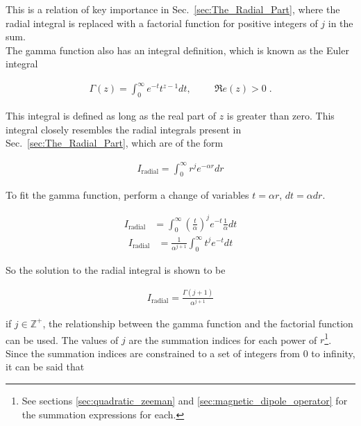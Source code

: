         \noindent This is a relation of key importance in Sec.~\ref{sec:The_Radial_Part}, where the radial integral is replaced with a factorial function for positive integers of $j$ in the sum.\\

        The gamma function also has an integral definition, which is known as the Euler integral

        \begin{align}
            \Gamma(z) = \int_0^\infty e^{-t} t^{z-1} dt, \hspace{1cm} \mathfrak{R}e(z) > 0\;.
        \end{align}

        \noindent This integral is defined as long as the real part of $z$ is greater than zero. This integral closely resembles the radial integrals present in Sec.~\ref{sec:The_Radial_Part}, which are of the form

        \begin{align}
            I_{\text{radial}} = \int_0^\infty r^j e^{-\alpha r} dr
        \end{align}

        \noindent To fit the gamma function, perform a change of variables $t = \alpha r$, $dt = \alpha dr$.

        \begin{align}
            I_{\text{radial}} &= \int_0^\infty \left( \frac{t}{\alpha} \right)^j e^{-t} \frac{1}{\alpha} dt
        \end{align}
        \begin{align}
            I_{\text{radial}} &= \frac{1}{\alpha^{j+1}}\int_0^\infty {t}^j e^{-t} dt
        \end{align}

        \noindent So the solution to the radial integral is shown to be 

        \begin{align}
            I_{\text{radial}} = \frac{\Gamma(j+1)}{\alpha^{j+1}}
        \end{align}

        \noindent if $j \in \mathbb{Z}^+$, the relationship between the gamma function and the factorial function can be used. The values of $j$ are the summation indices for each power of $r$\footnote{See sections \ref{sec:quadratic_zeeman} and \ref{sec:magnetic_dipole_operator} for the summation expressions for each.}. Since the summation indices are constrained to a set of integers from 0 to infinity, it can be said that 

